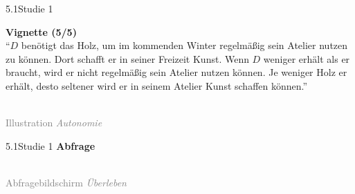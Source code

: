 \documentclass[xcolor=table,9pt,aspectratio=169]{beamer}
\begin{document}
\begin{frame}{\vspace*{10mm}5.1\hspace*{1em}Studie 1}
\begin{multicols}{2}
   \textbf{Vignette (5/5)}\\
   \medskip
   \enquote{$D$ benötigt das Holz, um im kommenden Winter regelmäßig sein Atelier nutzen zu können. Dort schafft er in seiner Freizeit Kunst. Wenn $D$ weniger erhält als er braucht, wird er nicht regelmäßig sein Atelier nutzen können. Je weniger Holz er erhält, desto seltener wird er in seinem Atelier Kunst schaffen können.}
   \vfill
   \begin{center}
      \\
      \textcolor{gray}{Illustration \textit{Autonomie}}
   \end{center}
\end{multicols}
\end{frame}


\begin{frame}{\vspace*{10mm}5.1\hspace*{1em}Studie 1}
\textbf{Abfrage}\\
\medskip
\begin{center}
   \\
   \textcolor{gray}{Abfragebildschirm \textit{Überleben}}
\end{center}
\end{frame}
\end{document}
